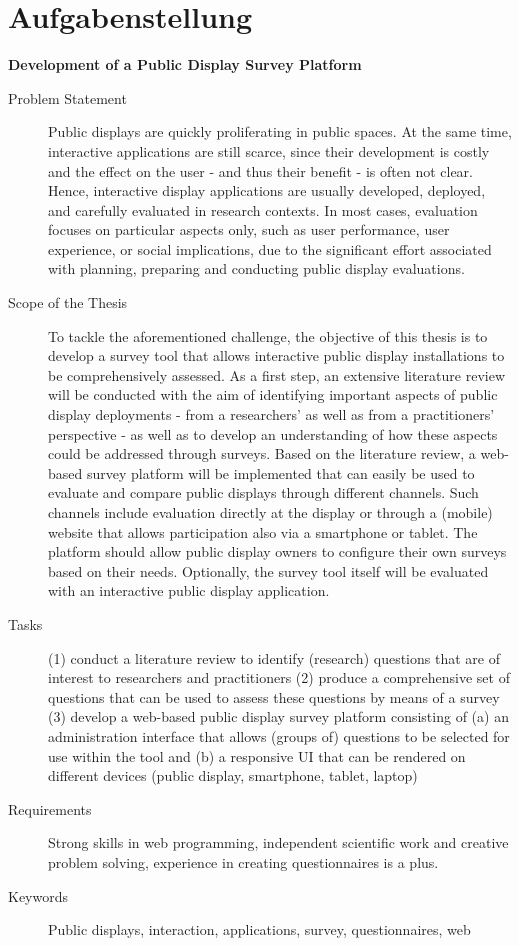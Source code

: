 \section*{Aufgabenstellung} %
\label{aufgabenstellung}

\textbf{Development of a Public Display Survey Platform}

\begin{description}
    \item[Problem Statement] Public displays are quickly proliferating in public spaces. At the same time, interactive applications are still scarce, since their development is costly and the effect on the user - and thus their benefit - is often not clear. Hence, interactive display applications are usually developed, deployed, and carefully evaluated in research contexts. In most cases, evaluation focuses on particular aspects only, such as user performance, user experience, or social implications, due to the significant effort associated with planning, preparing and conducting public display evaluations.
    \item[Scope of the Thesis] To tackle the aforementioned challenge, the objective of this thesis is to develop a survey tool that allows interactive public display installations to be comprehensively assessed. As a first step, an extensive literature review will be conducted with the aim of identifying important aspects of public display deployments - from a researchers' as well as from a practitioners' perspective - as well as to develop an understanding of how these aspects could be addressed through surveys. Based on the literature review, a web-based survey platform will be implemented that can easily be used to evaluate and compare public displays through different channels. Such channels include evaluation directly at the display or through a (mobile) website that allows participation also via a smartphone or tablet. The platform should allow public display owners to configure their own surveys based on their needs. Optionally, the survey tool itself will be evaluated with an interactive public display application.

    \item[Tasks] 
    (1) conduct a literature review to identify (research) questions that are of interest to researchers and practitioners \newline
(2) produce a comprehensive set of questions that can be used to assess these questions by means of a survey \newline
(3) develop a web-based public display survey platform consisting of (a) an administration interface that allows (groups of) questions to be selected for use within the tool and
(b) a responsive UI that can be rendered on different devices (public display, smartphone, tablet, laptop)

    \item[Requirements] Strong skills in web programming, independent scientific work and creative problem solving, experience in creating questionnaires is a plus.

    \item[Keywords] Public displays, interaction, applications, survey, questionnaires, web

\end{description}